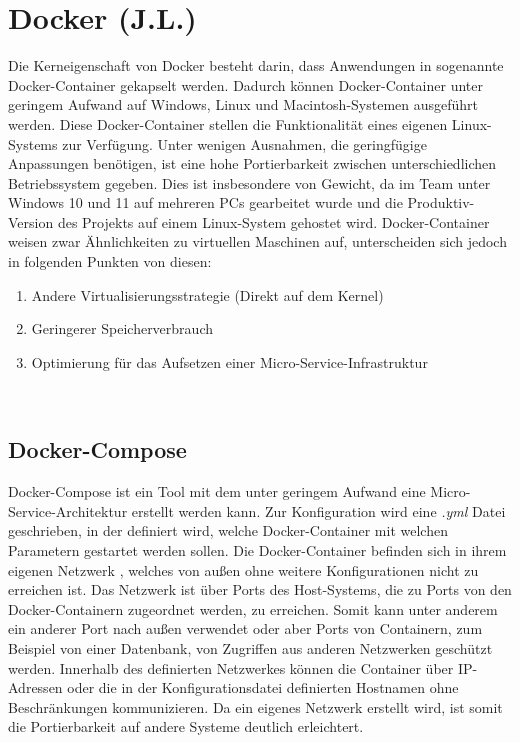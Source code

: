 \section{Docker (J.L.)}
\label{sec-docker}
Die Kerneigenschaft von Docker \cite{docker} besteht darin, dass Anwendungen in sogenannte 
Docker-Container gekapselt werden. Dadurch können Docker-Container unter geringem Aufwand 
auf Windows, Linux und Macintosh-Systemen ausgeführt werden. Diese Docker-Container stellen 
die Funktionalität eines eigenen Linux-Systems zur Verfügung. Unter wenigen Ausnahmen, die 
geringfügige Anpassungen benötigen, ist eine hohe Portierbarkeit zwischen unterschiedlichen 
Betriebssystem gegeben. Dies ist insbesondere von Gewicht, da im Team unter Windows 10 und 
11 auf mehreren PCs gearbeitet wurde und die Produktiv-Version des Projekts auf einem Linux-System 
gehostet wird. Docker-Container weisen zwar Ähnlichkeiten zu virtuellen Maschinen auf, 
unterscheiden sich jedoch in folgenden Punkten von diesen:
\begin{enumerate}
    \item Andere Virtualisierungsstrategie (Direkt auf dem Kernel)
    \item Geringerer Speicherverbrauch
    \item Optimierung für das Aufsetzen einer Micro-Service-Infrastruktur
\end{enumerate}~\\
 


\subsection{Docker-Compose}
Docker-Compose \cite{docker-compose} ist ein Tool mit dem unter geringem Aufwand eine 
Micro-Service-Architektur erstellt werden kann. Zur Konfiguration wird eine \textit{.yml} 
Datei geschrieben, in der definiert wird, welche Docker-Container mit welchen Parametern 
gestartet werden sollen. Die Docker-Container befinden sich in ihrem eigenen 
Netzwerk \cite{docker-network}, welches von außen ohne weitere Konfigurationen nicht zu 
erreichen ist. Das Netzwerk ist über Ports des Host-Systems, die zu Ports von den 
Docker-Containern zugeordnet werden, zu erreichen. Somit kann unter anderem ein anderer Port 
nach außen verwendet oder aber Ports von Containern, zum Beispiel von einer Datenbank, 
von Zugriffen aus anderen Netzwerken geschützt werden. Innerhalb des definierten Netzwerkes 
können die Container über IP-Adressen oder die in der Konfigurationsdatei definierten Hostnamen 
ohne Beschränkungen kommunizieren. Da ein eigenes Netzwerk erstellt wird, ist 
somit die Portierbarkeit auf andere Systeme deutlich erleichtert.
